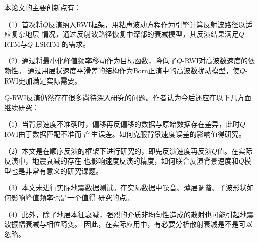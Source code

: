 
本论文的主要创新点有：

（1）首次将$Q$反演纳入RWI框架，用粘声波动方程作为引擎计算反射波路径以适应复杂地层
情况，通过反射波路径恢复中深部的衰减模型，其反演结果满足$Q$-RTM与$Q$-LSRTM
的需求。

（2）通过将最小化峰值频率移动作为目标函数，降低了$Q$-RWI对高波数速度的依赖性。
通过用层状速度平滑差的结构作为Born正演中的高波数扰动模型，使$Q$-RWI更加满足实际需要。


$Q$-RWI反演仍然存在很多尚待深入研究的问题。作者认为今后还应在以下几方面
继续研究：

（1）当背景速度不准确时，偏移再反偏移的数据与原始数据存在差异，此时$Q$-RWI由于数据匹配不准而
产生误差。如何克服背景速度误差的影响值得研究。

（2）本文是在顺序反演的框架下进行研究的，即先反演速度再反演$Q$值。在实际反演中，地震衰减的存在
也影响速度反演的精度，如何联合反演背景速度和$Q$模型也是非常有意义的研究课题。

（3）本文未进行实际地震数据测试。在实际数据中噪音、薄层调谐、子波形状如何影响峰值频率也是一个值得
研究的点。

（4）此外，除了地层本征衰减，强烈的介质非均匀性造成的散射也可能引起地震波振幅衰减与相位畸变。
因此，在实际应用中，有必要分析散射衰减是不是可以忽略。
